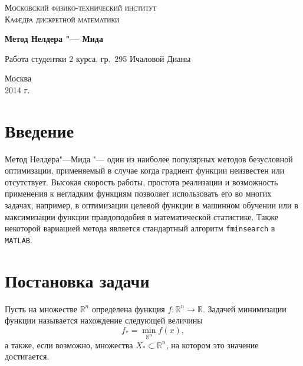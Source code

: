 \documentclass[12pt]{article}
\theoremstyle{plain}
\theoremstyle{remark}
\theoremstyle{definition}
\begin{document}
\begin{titlepage}

\begin{center}

\textsc{\Large Московский физико-технический институт}\\[0.5cm]
\textsc{\large Кафедра дискретной математики}\\[1cm]

\vfill


{ \LARGE \bfseries Метод Нелдера "--- Мида}
\end{center}

\vfill 

\begin{flushright} 
\begin{minipage}{0.5\textwidth}
\begin{flushright}
\normalsize
Работа студентки 2 курса, гр.~295 Ичаловой Дианы\\
\end{flushright}
\end{minipage}
\end{flushright}


\vfill

\begin{center}
{\large Москва\\
2014 г.}
\end{center}

\end{titlepage}


\section{Введение}

Метод Нелдера"---Мида "--- один из наиболее популярных методов безусловной оптимизации, применяемый в случае когда градиент функции неизвестен или отсутствует. Высокая скорость работы, простота реализации и возможность применения к негладким функциям позволяет использовать его во многих задачах, например, в оптимизации целевой функции в машинном обучении или в максимизации функции правдоподобия в математической статистике. Также некоторой вариацией метода является стандартный алгоритм \texttt{fminsearch} в \texttt{MATLAB}.

\section{Постановка задачи} %

Пусть на множестве $\mathbb{R}^n$ определена функция $f: \mathbb{R}^n \to \mathbb{R} $. Задачей минимизации функции называется нахождение следующей величины
\[
f_* = \min_{\mathbb{R}^n}f(x),
\]
а также, если возможно, множества $X_* \subset \mathbb{R}^n$, на котором это значение достигается.
\end{document}
